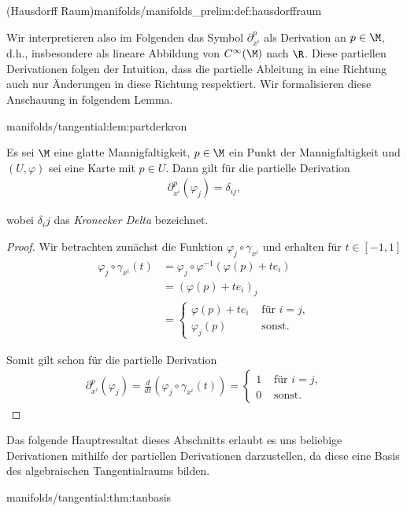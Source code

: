 \documentclass[letterpaper,10pt,english]{jupyterBook}
\begin{document}
\begin{definition}{(Hausdorff Raum)}{manifolds/manifolds_prelim:def:hausdorffraum}
\par
Wir interpretieren also im Folgenden das Symbol \(\partial_{x^{i}}^p\) als Derivation an \(p\in\M\), d.h., insbesondere als lineare Abbildung von \(C^\infty(\M)\) nach \(\R\).
Diese partiellen Derivationen folgen der Intuition, dass die partielle Ableitung in eine Richtung auch nur Änderungen in diese Richtung respektiert.
Wir formalisieren diese Anschauung in folgendem Lemma.
\begin{lemma}{}{manifolds/tangential:lem:partderkron}



\par
Es sei \(\M\) eine glatte Mannigfaltigkeit, \(p\in\M\) ein Punkt der Mannigfaltigkeit und \((U,\varphi)\) sei eine Karte mit \(p\in U\).
Dann gilt für die partielle Derivation
\begin{align*}
\partial_{x^i}^p(\varphi_j) = \delta_{ij},
\end{align*}
\par
wobei \(\delta_ij\) das \emph{Kronecker Delta} bezeichnet.
\end{lemma}

\begin{proof}
 Wir betrachten zunächst die Funktion \(\varphi_j \circ \gamma_{x^i}\) und erhalten für \(t\in [-1,1]\)
\begin{align*}
\varphi_j \circ \gamma_{x^i}(t)
&= \varphi_j \circ \varphi^{-1}(\varphi(p) + t e_i)\\
&= (\varphi(p) + t e_i)_j\\ 
&=
\begin{cases}
\varphi(p) + t e_i &\text{ für } i=j,\\
\varphi_j(p)&\text{ sonst}.
\end{cases}
\end{align*}
\par
Somit gilt schon für die partielle Derivation
\begin{align*}
\partial_{x^i}^p(\varphi_j)=
\frac{d}{dt} (\varphi_j \circ \gamma_{x^i}(t)) = 
\begin{cases}
1&\text{ für } i=j,\\
0&\text{ sonst}.
\end{cases}
\end{align*}\end{proof}

\par
Das folgende Hauptresultat dieses Abschnitts erlaubt es uns beliebige Derivationen mithilfe der partiellen Derivationen darzustellen, da diese eine Basis des algebraischen Tangentialraums bilden.
\begin{theorem}{}{manifolds/tangential:thm:tanbasis}




\end{theorem}
\end{definition}
\end{document}
